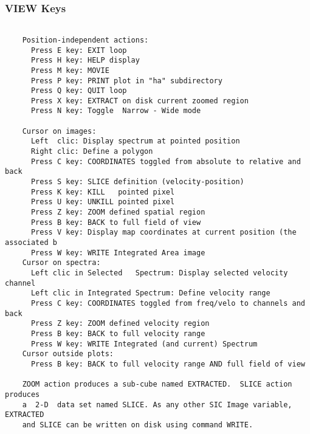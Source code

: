 \subsubsection{VIEW Keys}
\begin{verbatim}

    Position-independent actions:
      Press E key: EXIT loop
      Press H key: HELP display
      Press M key: MOVIE
      Press P key: PRINT plot in "ha" subdirectory
      Press Q key: QUIT loop
      Press X key: EXTRACT on disk current zoomed region
      Press N key: Toggle  Narrow - Wide mode

    Cursor on images:
      Left  clic: Display spectrum at pointed position
      Right clic: Define a polygon
      Press C key: COORDINATES toggled from absolute to relative and back
      Press S key: SLICE definition (velocity-position)
      Press K key: KILL   pointed pixel
      Press U key: UNKILL pointed pixel
      Press Z key: ZOOM defined spatial region
      Press B key: BACK to full field of view
      Press V key: Display map coordinates at current position (the associated b
      Press W key: WRITE Integrated Area image
    Cursor on spectra:
      Left clic in Selected   Spectrum: Display selected velocity channel
      Left clic in Integrated Spectrum: Define velocity range
      Press C key: COORDINATES toggled from freq/velo to channels and back
      Press Z key: ZOOM defined velocity region
      Press B key: BACK to full velocity range
      Press W key: WRITE Integrated (and current) Spectrum
    Cursor outside plots:
      Press B key: BACK to full velocity range AND full field of view

    ZOOM action produces a sub-cube named EXTRACTED.  SLICE action  produces
    a  2-D  data set named SLICE. As any other SIC Image variable, EXTRACTED
    and SLICE can be written on disk using command WRITE.


\end{verbatim}

